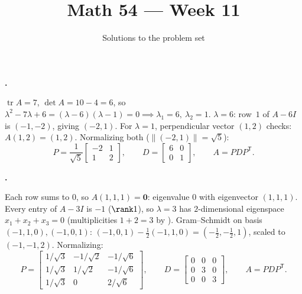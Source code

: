 \documentclass[10pt]{scrartcl}
\title{Math 54 --- Week 11}
\subtitle{Solutions to the problem set}
\author{}\date{}\ihead{}
\newcommand{\vv}[1]{\mathbf{#1}}
\DeclareMathOperator{\tr}{tr}
\begin{document}
\maketitle

\begin{prob}
  \textbf{.}\par{}
  \begin{steps}
    \ii $\tr A=7$, $\det A=10-4=6$, so $\lambda^2-7\lambda+6=(\lambda-6)(\lambda-1)=0\implies\lambda_1=6,\ \lambda_2=1$.
    \ii $\lambda=6$: row~$1$ of $A-6I$ is $(-1,-2)$, giving $(-2,1)$. For $\lambda=1$, perpendicular vector $(1,2)$ checks: $A(1,2)=(1,2)$.
    \ii Normalizing both ($\|(-2,1)\|=\sqrt{5}$):
    \[
      P=\frac{1}{\sqrt{5}}\begin{bmatrix}-2&1\\1&2\end{bmatrix},\qquad
      D=\begin{bmatrix}6&0\\0&1\end{bmatrix},\qquad A=PDP^{\mathsf T}.
    \]
  \end{steps}
\end{prob}

\begin{prob}
  \textbf{.}\par{}
  \begin{steps}
    \ii Each row sums to $0$, so $A(1,1,1)=\vv 0$: eigenvalue $0$ with eigenvector $(1,1,1)$.
    \ii Every entry of $A-3I$ is $-1$ ($\rank 1$), so $\lambda=3$ has $2$-dimensional eigenspace $x_1+x_2+x_3=0$ (multiplicities $1+2=3$ by ).
    \ii Gram--Schmidt on basis $(-1,1,0), (-1,0,1)$: $(-1,0,1)-\frac12(-1,1,0)=(-\frac12,-\frac12,1)$, scaled to $(-1,-1,2)$.
    \ii Normalizing:
    \[
      P=\begin{bmatrix}1/\sqrt{3}&-1/\sqrt{2}&-1/\sqrt{6}\\1/\sqrt{3}&1/\sqrt{2}&-1/\sqrt{6}\\1/\sqrt{3}&0&2/\sqrt{6}\end{bmatrix},\qquad
      D=\begin{bmatrix}0&0&0\\0&3&0\\0&0&3\end{bmatrix},\qquad A=PDP^{\mathsf T}.
    \]
  \end{steps}
\end{prob}
\end{document}
